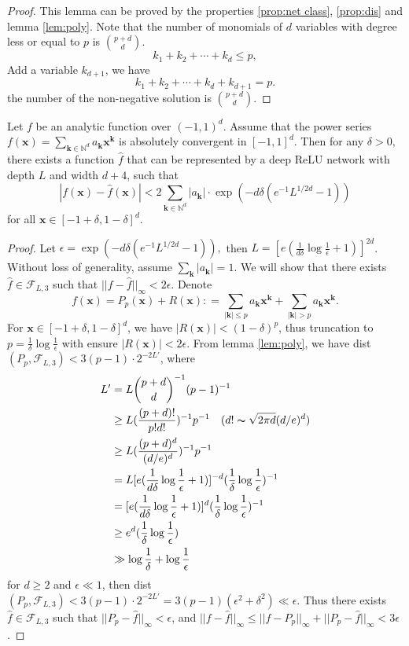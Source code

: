\begin{proof}
This lemma can be proved by the properties \ref{prop:net class}, \ref{prop:dis} and lemma \ref{lem:poly}.
Note that the number of monomials of $d$ variables with degree less or equal to $p$ is $\binom{p+d}{d}$.
$$
k_1 + k_2 + \cdots + k_d \le p,
$$
Add a variable $k_{d+1}$, we have
$$
k_1 + k_2 + \cdots + k_d + k_{d+1} = p.
$$
the number of the non-negative solution is $\binom{p+d}{d}$.
\end{proof}

\begin{theorem}
Let $f$ be an analytic function over $(-1,1)^d$. Assume that the power series $f(\bm x) = \sum_{\bm k\in \mathbb N^d}a_{\bm k}\bm x^{\bm k}$ is absolutely convergent in $[-1,1]^d.$ Then for any $\delta>0,$ there exists a function $\hat f$ that can be represented by a deep ReLU network with depth $L$ and width $d+4$, such that
\[
|f(\bm x) - \hat f(\bm x)|<2\sum_{\bm k\in \mathbb N^d}|a_{\bm k}|\cdot \exp\left(-d\delta\left(e^{-1}L^{1/2d}-1\right)\right)
\]
for all $\bm x\in [-1+\delta,1-\delta]^d.$
\end{theorem}
\begin{proof}
Let $\epsilon = \exp(-d\delta(e^{-1}L^{1/2d}-1)),$ then $L = [e(\frac{1}{d\delta}\log\frac{1}{\epsilon}+1)]^{2d}$. Without loss of generality, assume $\sum_{\bm k}|a_{\bm k}|=1.$ We will show that there exists $\hat f\in \mathcal F_{L,3}$ such that $||f-\hat f||_{\infty}<2\epsilon.$
Denote 
$$
f(\bm x) = P_p(\bm x) + R(\bm x): = \sum_{|\bm k|\le p}a_{\bm k}\bm x^{\bm k} +  \sum_{|\bm k|> p}a_{\bm k}\bm x^{\bm k}.
$$
For $\bm x\in [-1+\delta,1-\delta]^d$, we have $|R(\bm x)|<(1-\delta)^p$, thus truncation to $p = \frac{1}{\delta}\log\frac{1}{\epsilon}$ with ensure $|R(\bm x)|<2\epsilon$. From lemma \ref{lem:poly}, we have dist$(P_p,\mathcal F_{L,3})<3(p-1)\cdot 2^{-2L'}$, where 
\[
\begin{split}
L' &= L\binom{p+d}{d}^{-1}(p-1)^{-1}\\
   &\ge L(\frac{(p+d)!}{p!d!})^{-1}p^{-1}\quad (d! \thicksim \sqrt{2\pi d}(d/e)^d)\\
   &\ge L(\frac{(p+d)^d}{(d/e)^d})^{-1}p^{-1}\\
   &= L[e(\frac{1}{d\delta}\log \frac{1}{\epsilon}+1)]^{-d}(\frac{1}{\delta}\log\frac{1}{\epsilon})^{-1}\\
   & = [e(\frac{1}{d\delta}\log \frac{1}{\epsilon}+1)]^{d}(\frac{1}{\delta}\log\frac{1}{\epsilon})^{-1}\\
   & \ge e^d (\frac{1}{\delta}\log\frac{1}{\epsilon}) \\
   &\gg\log\frac{1}{\delta}+ \log\frac{1}{\epsilon}
\end{split}
\]
for $d\ge 2$ and $\epsilon\ll 1$, then dist$(P_p,\mathcal F_{L,3})<3(p-1)\cdot 2^{-2L'} = 3(p-1)(\epsilon^2+\delta^2)\ll\epsilon$. Thus there exists $\hat f\in \mathcal F_{L,3}$ such that $||P_p - \hat f||_{\infty}<\epsilon$, and $||f-\hat f||_{\infty}\le ||f-P_p||_\infty + ||P_p - \hat f||_\infty<3\epsilon$.
\end{proof}

